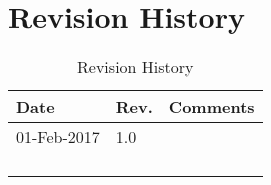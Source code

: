 \chapter{Revision History}\label{revision-history}

\begin{longtable}[]{@{}lll@{}}
	\toprule
	Date & Rev. & Comments\tabularnewline
	\midrule
	\endhead
	01-Feb-2017 & 1.0 &\tabularnewline
	            &     &\tabularnewline
	            &     &\tabularnewline
	            &     &\tabularnewline
	\bottomrule
	\caption{Revision History}
\end{longtable}
 
